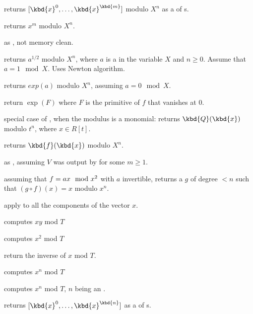  returns $[\kbd{x}^0,
\dots, \kbd{x}^\kbd{m}]$ modulo $X^n$ as a  of s.

 returns $x^m$ modulo
$X^n$.

 as ,
not memory clean.

 returns $a^{1/2}$ modulo $X^n$,
where $a$ is a  in the variable $X$ and $n \geq 0$.
Assume that $a = 1 \mod{X}$. Uses Newton algorithm.

 returns $exp(a)$ modulo $X^n$, assuming
$a = 0 \mod{X}$.

 return $\exp(F)$
where $F$ is the primitive of $f$ that vanishes at $0$.

 special case of
, when the modulus is a monomial:
returns $\kbd{Q}(\kbd{x})$ modulo $t^n$, where $x \in R[t]$.

 returns $\kbd{f}(\kbd{x})$ modulo
$X^n$.

 as ,
assuming $V$ was output by  for some $m\geq 1$.

 assuming that $f = a\*x \mod{x^2}$
with $a$ invertible, returns a  $g$ of degree $< n$ such that $(g
\circ f)(x) = x$ modulo $x^n$.


 apply 
to all the components of the vector $x$.


 computes $xy$ mod $T$

 computes $x^2$ mod $T$

 return the inverse of $x$ mod $T$.

 computes $x^n$ mod $T$

 computes $x^n$ mod $T$,
$n$ being an .

 returns $[\kbd{x}^0,
\dots, \kbd{x}^\kbd{n}]$ as a  of s.

